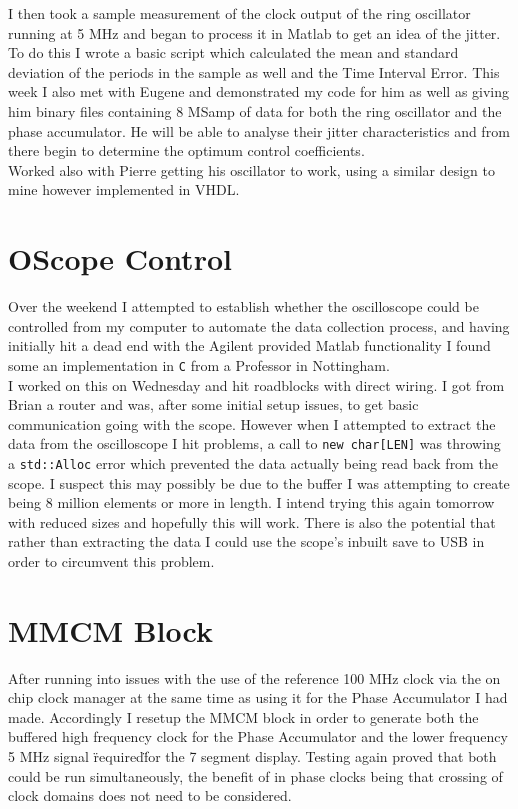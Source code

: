 \documentclass[a4paper,12pt]{report}
\begin{document}
I then took a sample measurement of the clock output of the ring oscillator running at 5 MHz and began to process it in Matlab to get an idea of the jitter. To do this I wrote a basic script which calculated the mean and standard deviation of the periods in the sample as well and the Time Interval Error.
This week I also met with Eugene and demonstrated my code for him as well as giving him binary files containing 8 MSamp of data for both the ring oscillator and the phase accumulator. He will be able to analyse their jitter characteristics and from there begin to determine the optimum control coefficients.\\
Worked also with Pierre getting his oscillator to work, using a similar design to mine however implemented in VHDL.\\

\section*{OScope Control}
Over the weekend I attempted to establish whether the oscilloscope could be controlled from my computer to automate the data collection process, and having initially hit a dead end with the Agilent provided Matlab functionality I found some an implementation in \texttt{C} from a Professor in Nottingham.\\
I worked on this on Wednesday and hit roadblocks with direct wiring. I got from Brian a router and was, after some initial setup issues, to get basic communication going with the scope.
However when I attempted to extract the data from the oscilloscope I hit problems, a call to \texttt{new char[LEN]} was throwing a \texttt{std::Alloc} error which prevented the data actually being read back from the scope. 
I suspect this may possibly be due to the buffer I was attempting to create being 8 million elements or more in length. 
I intend trying this again tomorrow with reduced sizes and hopefully this will work. There is also the potential that rather than extracting the data I could use the scope's inbuilt save to USB in order to circumvent this problem.


\section*{MMCM Block}
After running into issues with the use of the reference 100 MHz clock via the on chip clock manager at the same time as using it for the Phase Accumulator I had made. Accordingly I resetup the MMCM block in order to generate both the buffered high frequency clock for the Phase Accumulator and the lower frequency 5 MHz signal \"required\" for the 7 segment display. Testing again proved that both could be run simultaneously, the benefit of in phase clocks being that crossing of clock domains does not need to be considered.
\end{document}
